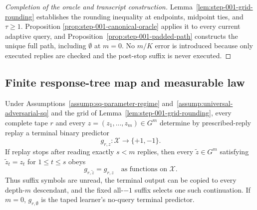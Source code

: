 \begin{proof}[Completion of the oracle and transcript construction]
Lemma~\ref{lem:step-001-grid-rounding} establishes the rounding inequality
at endpoints, midpoint ties, and \(\tau\ge1\).  Proposition
\ref{prop:step-001-canonical-oracle} applies it to every current adaptive
query, and Proposition~\ref{prop:step-001-padded-path} constructs the unique
full path, including \(\emptyset\) at \(m=0\).  No \(m/K\) error is
introduced because only executed replies are checked and the post-stop
suffix is never executed.
\end{proof}

\subsection{Finite response-tree map and measurable law}
\label{app:step-002}

\begin{proposition}
\label{prop:step-002-total-replay}
Under Assumptions~\ref{assump:sq-parameter-regime}
and~\ref{assump:universal-adversarial-sq} and the grid of
Lemma~\ref{lem:step-001-grid-rounding}, every complete tape \(r\) and every
\(z=(z_1,\ldots,z_m)\in G^m\) determine by prescribed-reply replay a
terminal binary predictor
\[
g_{r,z}:\mathcal X\to\{+1,-1\}.
\]
If replay stops after reading exactly \(s<m\) replies, then every
\(\widetilde z\in G^m\) satisfying
\(\widetilde z_t=z_t\) for \(1\le t\le s\) obeys
\[
g_{r,\widetilde z}=g_{r,z}
\quad\text{as functions on }\mathcal X.
\]
Thus suffix symbols are unread, the terminal output can be copied to every
depth-\(m\) descendant, and the fixed all-\(-1\) suffix selects one such
continuation.  If \(m=0\), \(g_{r,\emptyset}\) is the taped learner's
no-query terminal predictor.
\end{proposition}

